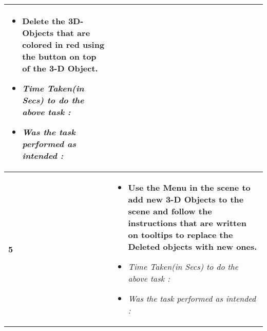 \documentclass{article}
\begin{document}
\begin{table}[htb]
\begin{tabular}{| m{0.75cm} | m{10cm} |}
\begin{itemize}[label={}]
			\item \textbf{Delete the 3D-Objects that are colored in red using the button on top of the 3-D Object.}
			\item \textit{Time Taken(in Secs) to do the above task :}
			\item \textit{Was the task performed as intended :}
		\end{itemize} \\
		\hline \hfill \break
		\textbf{5}       &
		\begin{itemize}[label={}]
			\item \textbf{Use the Menu in the scene to add new 3-D Objects to the scene and follow the instructions that are written on tooltips to replace the Deleted objects with new ones.}
			\item \textit{Time Taken(in Secs) to do the above task :}
			\item \textit{Was the task performed as intended :}
		\end{itemize} \\
		\hline
	\end{tabular}
\end{table}
\end{document}
